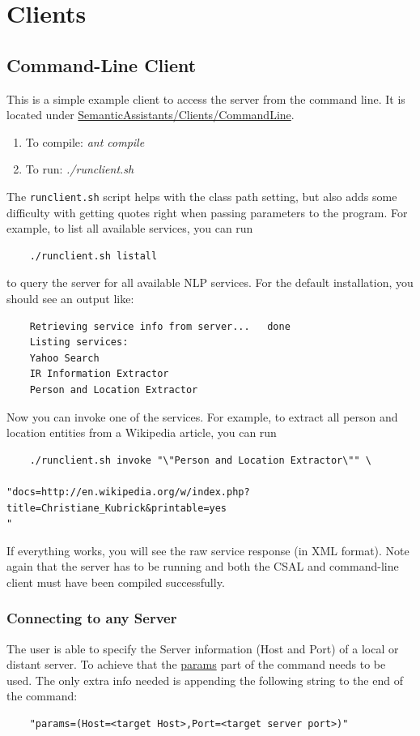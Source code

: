 \chapter{\sa Clients}\label{chap:clients}

\section{Command-Line Client}
\label{sec:sacl:clc}
This is a simple example client to access the server from the command line.
It is located under \url{SemanticAssistants/Clients/CommandLine}. 
\begin{enumerate}
\item To compile: \emph{ant compile}
\item To run: \emph{./runclient.sh}
\end{enumerate}

The \texttt{runclient.sh} script helps with the
class path setting, but also adds some difficulty with getting quotes right
when passing parameters to the program. For example, to list all
available services, you can run
\begin{verbatim}
    ./runclient.sh listall
\end{verbatim}
to query the server for all available NLP services. For the default
installation, you should see an output like:
\begin{verbatim}
    Retrieving service info from server...   done
    Listing services:
    Yahoo Search
    IR Information Extractor
    Person and Location Extractor
\end{verbatim}
Now you can invoke one of the services. For example, to extract all
person and location entities from a Wikipedia article, you can run
\begin{verbatim}
    ./runclient.sh invoke "\"Person and Location Extractor\"" \
   
"docs=http://en.wikipedia.org/w/index.php?title=Christiane_Kubrick&printable=yes
"
\end{verbatim}
If everything works, you will see the raw service response (in XML
format).  Note again that the server has to be running and both the
CSAL and command-line client must have been compiled successfully.

\subsection*{Connecting to any Server}
The user is able to specify the Server information (Host and Port) of
a local or distant server.  To achieve that the \url{params} part of the
command needs to be used.  The only extra info needed is appending the
following string to the end of the command:
\begin{verbatim}
    "params=(Host=<target Host>,Port=<target server port>)"
\end{verbatim}

